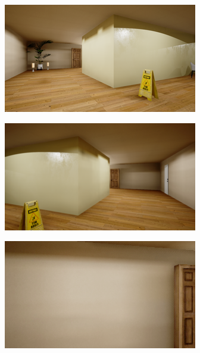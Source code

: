 \begin{figure}[H]
\begin{subfigure}{0.32\textwidth}
        \vspace{0.5em}
    \end{subfigure}
    \begin{subfigure}{0.32\textwidth}
        \centering
        \includegraphics[width=\textwidth]{resources/png/06/classification/datasets/6.png}
    \end{subfigure}
    \hfill
    \begin{subfigure}{0.32\textwidth}
        \centering
        \includegraphics[width=\textwidth]{resources/png/06/classification/datasets/7.png}
    \end{subfigure}
    \hfill
    \begin{subfigure}{0.32\textwidth}
        \centering
        \includegraphics[width=\textwidth]{resources/png/06/classification/datasets/8.png}

\end{subfigure}
\end{figure}
